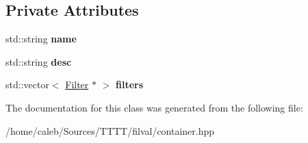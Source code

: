 \subsection*{Private Attributes}
\begin{DoxyCompactItemize}
\item 
\hypertarget{classfv_1_1GenContainer_aee9152c946640607feab1adb84aa08c7}{}\label{classfv_1_1GenContainer_aee9152c946640607feab1adb84aa08c7} 
std\+::string {\bfseries name}
\item 
\hypertarget{classfv_1_1GenContainer_ab81b296313d0911f66301b9343be1b1b}{}\label{classfv_1_1GenContainer_ab81b296313d0911f66301b9343be1b1b} 
std\+::string {\bfseries desc}
\item 
\hypertarget{classfv_1_1GenContainer_ab0a9af04074f17fb7bd7e84fafa5ac6c}{}\label{classfv_1_1GenContainer_ab0a9af04074f17fb7bd7e84fafa5ac6c} 
std\+::vector$<$ \hyperlink{classfv_1_1Filter}{Filter} $\ast$ $>$ {\bfseries filters}
\end{DoxyCompactItemize}


The documentation for this class was generated from the following file\+:\begin{DoxyCompactItemize}
\item 
/home/caleb/\+Sources/\+T\+T\+T\+T/filval/container.\+hpp\end{DoxyCompactItemize}
